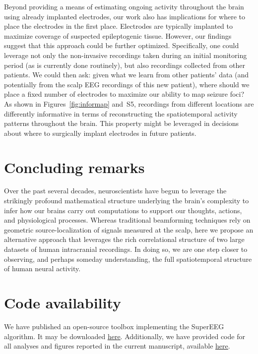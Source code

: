 \documentclass[11pt]{article}
\newcommand{\intersectmap}{S5}
\begin{document}
Beyond providing a means of estimating ongoing activity throughout the
brain using already implanted electrodes, our work also has
implications for where to place the electrodes in the first place.
Electrodes are typically implanted to maximize coverage of suspected
epileptogenic tissue.  However, our findings suggest that this
approach could be further optimized.  Specifically, one could leverage
not only the non-invasive recordings taken during an initial
monitoring period (as is currently done routinely), but also
recordings collected from other patients.  We could then ask: given
what we learn from other patients' data (and potentially from the
scalp EEG recordings of this new patient), where should we place a
fixed number of electrodes to maximize our ability to map seizure
foci?  As shown in Figures~\ref{fig:informap} and~\intersectmap, recordings from
different locations are differently informative in terms of
reconstructing the spatiotemporal activity patterns throughout the
brain.  This property might be leveraged in decisions about where to
surgically implant electrodes in future patients.

\section*{Concluding remarks}
Over the past several decades, neuroscientists have begun to leverage
the strikingly profound mathematical structure underlying the brain's
complexity to infer how our brains carry out computations to support
our thoughts, actions, and physiological processes.  Whereas
traditional beamforming techniques rely on geometric
source-localization of signals measured at the scalp, here we propose
an alternative approach that leverages the rich correlational
structure of two large datasets of human intracranial recordings.  In
doing so, we are one step closer to observing, and perhaps
someday understanding, the full spatiotemporal structure of human
neural activity.

\section*{Code availability}
We have published an open-source toolbox implementing the SuperEEG
algorithm.  It may be downloaded
\href{https://supereeg.readthedocs.io/en/latest/}{\underline{here}}. Additionally,
we have provided code for all analyses and figures reported in the
current manuscript, available
\href{https://github.com/ContextLab/supereeg_paper}{\underline{here}}.
\end{document}
